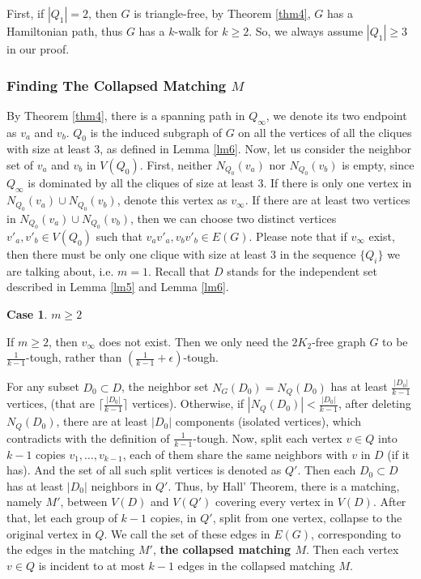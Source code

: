 \documentclass{amsart}
\newtheorem{case}{Case}
\begin{document}
First, if $|Q_1|=2$, then $G$ is triangle-free, by Theorem \ref{thm4}, $G$ has a Hamiltonian path, thus $G$ has a $k$-walk for $k\ge2$. So, we always assume $|Q_1|\ge3$ in our proof.

\subsubsection{Finding The Collapsed Matching $M$}
By Theorem \ref{thm4}, there is a spanning path in $Q_{\infty}$, we denote its two endpoint as $v_a$ and $v_b$. $Q_0$ is the induced subgraph of $G$ on all the vertices of all the cliques with size at least 3, as defined in Lemma \ref{lm6}. Now, let us consider the neighbor set of $v_a$ and $v_b$ in $V(Q_0)$. First, neither $N_{Q_0}(v_a)$ nor $N_{Q_0}(v_b)$ is empty, since $Q_{\infty}$ is dominated by all the cliques of size at least 3. If there is only one vertex in $N_{Q_0}(v_a)\cup N_{Q_0}(v_b)$, denote this vertex as $v_{\infty}$. If there are at least two vertices in $N_{Q_0}(v_a)\cup N_{Q_0}(v_b)$, then we can choose two distinct vertices $v'_a,v'_b\in V(Q_0)$ such that $v_av'_a,v_bv'_b\in E(G)$. Please note that if $v_{\infty}$ exist, then there must be only one clique with size at least 3 in the sequence $\{Q_i\}$ we are talking about, i.e. $m=1$.
Recall that $D$ stands for the independent set described in Lemma \ref{lm5} and Lemma \ref{lm6}. 

\begin{case}$m\ge2$\end{case}
If $m\ge2$, then $v_{\infty}$ does not exist. Then we only need the $2K_2$-free graph $G$ to be $\frac{1}{k-1}$-tough, rather than $(\frac{1}{k-1}+\epsilon)$-tough.

For any subset $D_0\subset D$, the neighbor set $N_{G}(D_0)=N_Q(D_0)$ has at least $\frac{|D_0|}{k-1}$ vertices, (that are $\lceil\frac{|D_0|}{k-1}\rceil$ vertices). Otherwise, if $|N_Q(D_0)|<\frac{|D_0|}{k-1}$, after deleting $N_Q(D_0)$, there are at least $|D_0|$ components (isolated vertices), which contradicts with the definition of $\frac{1}{k-1}$-tough. 
Now, split each vertex $v\in Q$ into $k-1$ copies $v_1,\ldots,v_{k-1}$, each of them share the same neighbors with $v$ in $D$ (if it has). And the set of all such split vertices is denoted as $Q'$.  Then each $D_0\subset D$ has at least $|D_0|$ neighbors in $Q'$.
Thus, by Hall' Theorem, there is a matching, namely $M'$, between $V(D)$ and $V(Q')$ covering every vertex in $V(D)$. 
After that, let each group of $k-1$ copies, in $Q'$, split from one vertex, collapse to the original vertex in $Q$. We call the set of these edges in $E(G)$, corresponding to the edges in the matching $M'$, {\bf the collapsed matching $M$}. Then each vertex $v\in Q$ is incident to at most $k-1$ edges in the collapsed matching $M$. 
\end{document}

